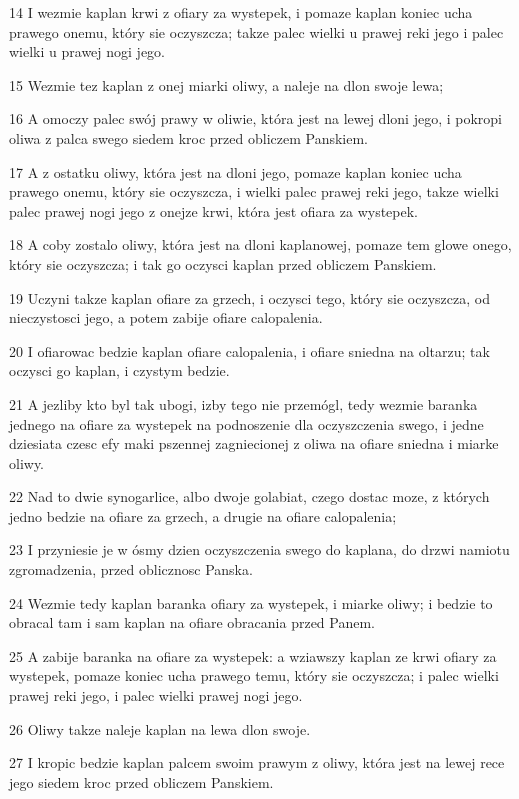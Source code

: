 \par 14 I wezmie kaplan krwi z ofiary za wystepek, i pomaze kaplan koniec ucha prawego onemu, który sie oczyszcza; takze palec wielki u prawej reki jego i palec wielki u prawej nogi jego.
\par 15 Wezmie tez kaplan z onej miarki oliwy, a naleje na dlon swoje lewa;
\par 16 A omoczy palec swój prawy w oliwie, która jest na lewej dloni jego, i pokropi oliwa z palca swego siedem kroc przed obliczem Panskiem.
\par 17 A z ostatku oliwy, która jest na dloni jego, pomaze kaplan koniec ucha prawego onemu, który sie oczyszcza, i wielki palec prawej reki jego, takze wielki palec prawej nogi jego z onejze krwi, która jest ofiara za wystepek.
\par 18 A coby zostalo oliwy, która jest na dloni kaplanowej, pomaze tem glowe onego, który sie oczyszcza; i tak go oczysci kaplan przed obliczem Panskiem.
\par 19 Uczyni takze kaplan ofiare za grzech, i oczysci tego, który sie oczyszcza, od nieczystosci jego, a potem zabije ofiare calopalenia.
\par 20 I ofiarowac bedzie kaplan ofiare calopalenia, i ofiare sniedna na oltarzu; tak oczysci go kaplan, i czystym bedzie.
\par 21 A jezliby kto byl tak ubogi, izby tego nie przemógl, tedy wezmie baranka jednego na ofiare za wystepek na podnoszenie dla oczyszczenia swego, i jedne dziesiata czesc efy maki pszennej zagniecionej z oliwa na ofiare sniedna i miarke oliwy.
\par 22 Nad to dwie synogarlice, albo dwoje golabiat, czego dostac moze, z których jedno bedzie na ofiare za grzech, a drugie na ofiare calopalenia;
\par 23 I przyniesie je w ósmy dzien oczyszczenia swego do kaplana, do drzwi namiotu zgromadzenia, przed oblicznosc Panska.
\par 24 Wezmie tedy kaplan baranka ofiary za wystepek, i miarke oliwy; i bedzie to obracal tam i sam kaplan na ofiare obracania przed Panem.
\par 25 A zabije baranka na ofiare za wystepek: a wziawszy kaplan ze krwi ofiary za wystepek, pomaze koniec ucha prawego temu, który sie oczyszcza; i palec wielki prawej reki jego, i palec wielki prawej nogi jego.
\par 26 Oliwy takze naleje kaplan na lewa dlon swoje.
\par 27 I kropic bedzie kaplan palcem swoim prawym z oliwy, która jest na lewej rece jego siedem kroc przed obliczem Panskiem.
